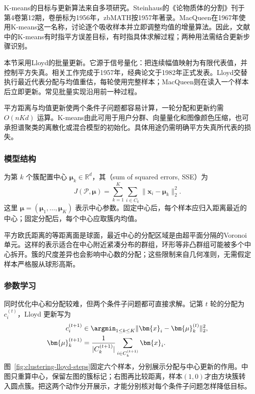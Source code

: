 K-means的目标与更新算法来自多项研究。Steinhaus的《论物质体的分割》刊于第4卷第12期，卷册标为1956年，zbMATH按1957年著录。MacQueen在1967年使用K-means这一名称，讨论逐个吸收样本并立即调整均值的增量算法。因此，文献中的K-means有时指平方误差目标，有时指具体求解过程；两种用法需结合更新步骤识别。

本节采用Lloyd的批量更新。它源于信号量化：把连续幅值映射为有限代表值，并控制平方失真。相关工作完成于1957年，经典论文于1982年正式发表。Lloyd交替执行最近代表分配与均值重估，每轮使用完整样本；MacQueen则在读入一个样本后立即更新。常见批量实现沿用前一种过程。

平方距离与均值更新使两个条件子问题都容易计算，一轮分配和更新约需 $O(nKd)$ 运算。K-means由此可用于用户分群、向量量化和图像颜色压缩，也可承担谱聚类的离散化或混合模型的初始化。具体用途仍需明确平方失真所代表的损失。

\subsubsection{模型结构}

为第 $k$ 个簇配置中心 $\bm{\mu}_k\in\mathbb{R}^d$，其（sum of squared errors, SSE）为
\begin{equation}
  J(\mathcal{P},\bm{\mu})
  =\sum_{k=1}^K\sum_{i\in C_k}
    \lVert\bm{x}_i-\bm{\mu}_k\rVert_2^2.
  \label{eq:clustering-sse}
\end{equation}
这里 $\bm{\mu}=(\bm{\mu}_1,\ldots,\bm{\mu}_K)$ 表示中心参数。固定中心后，每个样本应归入距离最近的中心；固定分配后，每个中心应取簇内均值。

平方欧氏距离的等距离面是球面，最近中心的分配区域是由超平面分隔的Voronoi单元。这样的表示适合在中心附近紧凑分布的群组，环形等非凸群组可能被多个中心拆开。簇的尺度差异也会影响中心数的分配；这些限制来自几何准则，无需假定样本严格服从球形高斯。

\subsubsection{参数学习}

同时优化中心和分配较难，但两个条件子问题都可直接求解。记第 $t$ 轮的分配为 $c_i^{(t)}$，Lloyd 更新写为
\begin{align}
  c_i^{(t+1)}
    &\in\argmin_{1\leq k\leq K}
      \lVert\bm{x}_i-\bm{\mu}_k^{(t)}\rVert_2^2,
      \label{eq:clustering-lloyd-assignment}\\
  \bm{\mu}_k^{(t+1)}
    &=\frac{1}{|C_k^{(t+1)}|}
      \sum_{i\in C_k^{(t+1)}}\bm{x}_i.
      \label{eq:clustering-lloyd-centre}
\end{align}
图~\ref{fig:clustering-lloyd-steps}固定六个样本，分别展示分配与中心更新的作用。中图只重算中心，保留左图的簇标记；右图再比较距离，样本$(1,0)$才由方块簇转入圆点簇。把这两个动作分开展示，才能分别核对每个条件子问题怎样降低目标。


